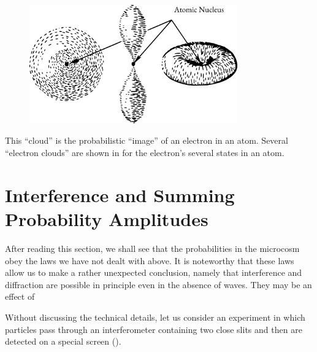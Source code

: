 \begin{figure}[!ht]
\centering
\includegraphics[width=0.8\textwidth]{figures/orbitals.pdf}
\end{figure}

This ``cloud'' is the probabilistic ``image'' of an electron in an atom.
Several ``electron clouds'' are shown in  for the electron's several states in an atom.

\section{Interference and Summing Probability Amplitudes}

After reading this section, we shall see that the probabilities in the
microcosm obey the laws we have not dealt with above. It is noteworthy
that these laws allow us to make a rather unexpected conclusion,
namely that interference and diffraction are possible in principle even in
the absence of waves. They may be an effect of 

 Without discussing the technical details, let us consider an experiment in which particles pass through an interferometer containing two close slits and
then are detected on a special screen (). 

